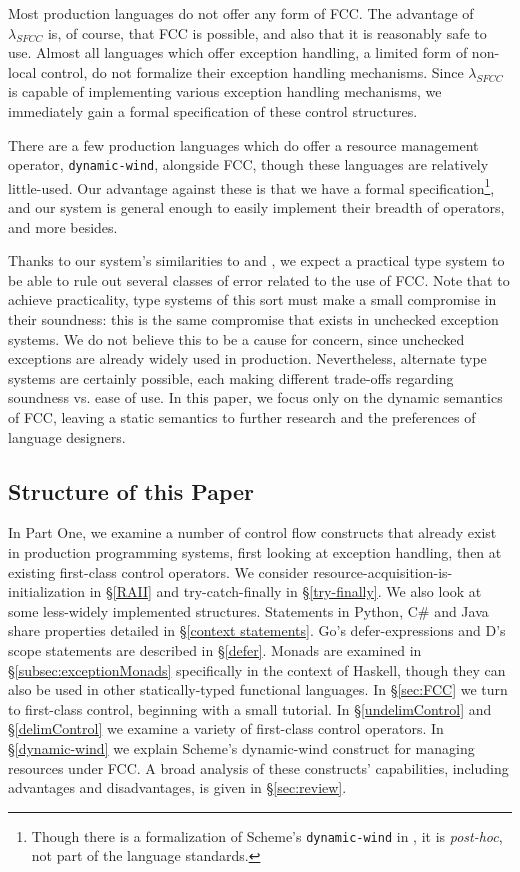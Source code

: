 \documentclass[11pt]{article}
\newcommand{\maybePage}{\newpage}
\begin{document}
Most production languages do not offer any form of FCC.
The advantage of $\lambda_{SFCC}$ is, of course, that FCC is possible, and also that it is reasonably safe to use.
Almost all languages which offer exception handling, a limited form of non-local control, do not formalize their exception handling mechanisms.
Since $\lambda_{SFCC}$ is capable of implementing various exception handling mechanisms, we immediately gain a formal specification of these control structures.

There are a few production languages which do offer a resource management operator, \texttt{dynamic-wind}, alongside FCC, though these languages are relatively little-used.
Our advantage against these is that we have a formal specification\footnote{Though there is a formalization of Scheme's \texttt{dynamic-wind} in \cite{SchemeOpSem}, it is \textit{post-hoc}, not part of the language standards.}, and our system is general enough to easily implement their breadth of operators, and more besides.

Thanks to our system's similarities to \cite{Gunter:1995} and \cite{MFDC}, we expect a practical type system to be able to rule out several classes of error related to the use of FCC.
Note that to achieve practicality, type systems of this sort must make a small compromise in their soundness: this is the same compromise that exists in unchecked exception systems.
We do not believe this to be a cause for concern, since unchecked exceptions are already widely used in production.
Nevertheless, alternate type systems are certainly possible, each making different trade-offs regarding soundness vs. ease of use.
In this paper, we focus only on the dynamic semantics of FCC, leaving a static semantics to further research and the preferences of language designers.

\maybePage
\subsection{Structure of this Paper}

In Part One, we examine a number of control flow constructs that already exist in production programming systems, first looking at exception handling, then at existing first-class control operators.
We consider resource-acquisition-is-initialization in \S\ref{RAII} and try-catch-finally in \S\ref{try-finally}.
We also look at some less-widely implemented structures.
Statements in Python, C\# and Java share properties detailed in \S\ref{context statements}.
Go's defer-expressions and D's scope statements are described in \S\ref{defer}.
Monads are examined in \S\ref{subsec:exceptionMonads} specifically in the context of Haskell, though they can also be used in other statically-typed functional languages.
In \S\ref{sec:FCC} we turn to first-class control, beginning with a small tutorial.
In \S\ref{undelimControl} and \S\ref{delimControl} we examine a variety of first-class control operators.
In \S\ref{dynamic-wind} we explain Scheme's dynamic-wind construct for managing resources under FCC.
A broad analysis of these constructs' capabilities, including advantages and disadvantages, is given in \S\ref{sec:review}.
\end{document}
